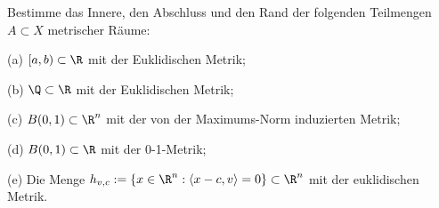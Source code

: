 \begin{prob}
Bestimme das Innere, den Abschluss und den Rand der folgenden
Teilmengen $A\subset X$ metrischer R\"aume:

(a) $[a,b)\subset\R$ mit der Euklidischen Metrik;

(b) $\Q\subset\R$ mit der Euklidischen Metrik;

(c) $B(0,1)\subset\R^n$ mit der von der Maximums-Norm induzierten Metrik; 

(d) $B(0,1)\subset\R$ mit der 0-1-Metrik;

(e) Die Menge $h_{v,c}:=\{x\in\R^n:\langle x-c,v\rangle=0\}\subset\R^n$ mit der euklidischen Metrik.
\end{prob}

